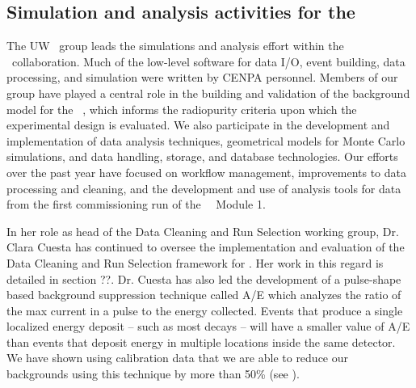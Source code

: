 \subsection {Simulation and analysis activities for the \MJ\ \MJDemo \label{MJDSimArticle}}


\noindent The UW \MJ\ group leads the simulations and analysis effort within the \MJ\ collaboration. Much of the low-level software for data I/O, event building, data processing, and simulation were written by CENPA personnel. Members of our group have played a central role in the building and validation of the background model for the \MJ\ \MJDemo, which informs the radiopurity criteria upon which the experimental design is evaluated. We also participate in the development and implementation of data analysis techniques, geometrical models for Monte Carlo simulations, and data handling, storage, and database technologies. Our efforts over the past year have focused on workflow management, improvements to data processing and cleaning, and the development and use of analysis tools for data from the first commissioning run of the \MJ\ \MJDemo\ Module 1.


In her role as head of the Data Cleaning and Run Selection working group, Dr. Clara Cuesta has continued to oversee the implementation and evaluation of the Data Cleaning and Run Selection framework for \MJ. Her work in this regard is detailed in section ??.\newline
\indent Dr. Cuesta has also led the development of a pulse-shape based background suppression technique called A/E which analyzes the ratio of the max current in a pulse to the energy collected. Events that produce a single localized energy deposit \--- such as most \nonubb decays \--- will have a smaller value of A/E than events that deposit energy in multiple locations inside the same detector. We have shown using  calibration data that we are able to reduce our backgrounds using this technique by more than 50\% (see ).

